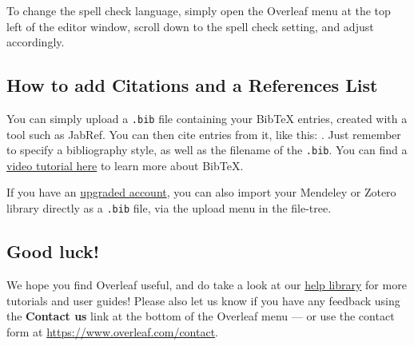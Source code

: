 \documentclass[twocolumn]{ltjsarticle}
\begin{document}
		To change the spell check language, simply open the Overleaf menu at the top left of the editor window, scroll down to the spell check setting, and adjust accordingly.

	\subsection{How to add Citations and a References List}

		You can simply upload a \verb|.bib| file containing your BibTeX entries, created with a tool such as JabRef. You can then cite entries from it, like this: \cite{greenwade93}. Just remember to specify a bibliography style, as well as the filename of the \verb|.bib|. You can find a \href{https://www.overleaf.com/help/97-how-to-include-a-bibliography-using-bibtex}{video tutorial here} to learn more about BibTeX.

		If you have an \href{https://www.overleaf.com/user/subscription/plans}{upgraded account}, you can also import your Mendeley or Zotero library directly as a \verb|.bib| file, via the upload menu in the file-tree.

	\subsection{Good luck!}

		We hope you find Overleaf useful, and do take a look at our \href{https://www.overleaf.com/learn}{help library} for more tutorials and user guides! Please also let us know if you have any feedback using the \textbf{Contact us} link at the bottom of the Overleaf menu --- or use the contact form at \url{https://www.overleaf.com/contact}.

		
		
\end{document}
